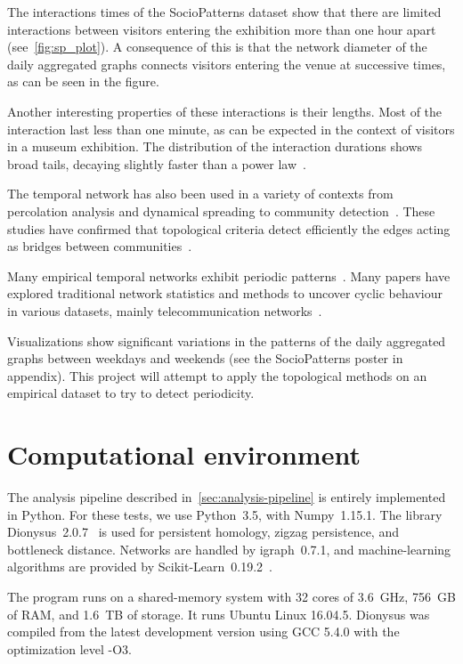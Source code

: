 \documentclass[a4paper,11pt,openany,extrafontsizes]{memoir}
\begin{document}
The interactions times of the SocioPatterns dataset show that there
are limited interactions between visitors entering the exhibition more
than one hour apart (see~\autoref{fig:sp_plot}). A consequence of this
is that the network diameter of the daily aggregated graphs connects
visitors entering the venue at successive times, as can be seen in the
figure.

Another interesting properties of these interactions is their
lengths. Most of the interaction last less than one minute, as can be
expected in the context of visitors in a museum exhibition. The
distribution of the interaction durations shows broad tails, decaying
slightly faster than a power law~\cite{isella_whats_2011}.

The temporal network has also been used in a variety of contexts from
percolation analysis and dynamical spreading to community
detection~\cite{isella_whats_2011}. These studies have confirmed that
topological criteria detect efficiently the edges acting as bridges
between communities~\cite{girvan_community_2002, holme_attack_2002}.

Many empirical temporal networks exhibit periodic
patterns~\cite{holme_modern_2015}. Many papers have explored
traditional network statistics and methods to uncover cyclic behaviour
in various datasets, mainly telecommunication
networks~\cite{jo_circadian_2012, aledavood_daily_2015,
  holme_network_2003, aledavood_digital_2015}.

Visualizations show significant variations in the patterns of the
daily aggregated graphs between weekdays and weekends (see the
SocioPatterns poster in appendix). This project will attempt to apply
the topological methods on an empirical dataset to try to detect
periodicity.

\section{Computational environment}%
\label{sec:comp-envir}

The analysis pipeline described in~\autoref{sec:analysis-pipeline} is
entirely implemented in Python. For these tests, we use Python~3.5,
with Numpy~1.15.1. The library
Dionysus~2.0.7~\cite{morozov_dionysus:_2018} is used for persistent
homology, zigzag persistence, and bottleneck distance. Networks are
handled by igraph~0.7.1, and machine-learning algorithms are provided
by Scikit-Learn~0.19.2~\cite{pedregosa_scikit-learn:_2011}.

The program runs on a shared-memory system with 32 cores of 3.6~GHz,
756~GB of RAM, and 1.6~TB of storage. It runs Ubuntu Linux
16.04.5. Dionysus was compiled from the latest development version
using GCC 5.4.0 with the optimization level -O3.
\end{document}
